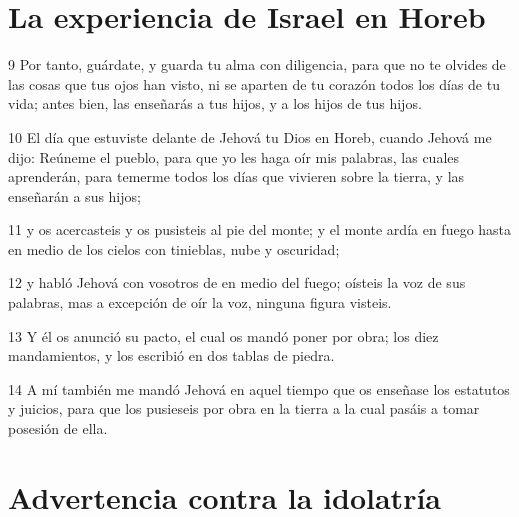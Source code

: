 \section{La experiencia de Israel en Horeb}

\par 9 Por tanto, guárdate, y guarda tu alma con diligencia, para que no te olvides de las cosas que tus ojos han visto, ni se aparten de tu corazón todos los días de tu vida; antes bien, las enseñarás a tus hijos, y a los hijos de tus hijos.
\par 10 El día que estuviste delante de Jehová tu Dios en Horeb, cuando Jehová me dijo: Reúneme el pueblo, para que yo les haga oír mis palabras, las cuales aprenderán, para temerme todos los días que vivieren sobre la tierra, y las enseñarán a sus hijos;
\par 11 y os acercasteis y os pusisteis al pie del monte; y el monte ardía en fuego hasta en medio de los cielos con tinieblas, nube y oscuridad;
\par 12 y habló Jehová con vosotros de en medio del fuego; oísteis la voz de sus palabras, mas a excepción de oír la voz, ninguna figura visteis.
\par 13 Y él os anunció su pacto, el cual os mandó poner por obra; los diez mandamientos, y los escribió en dos tablas de piedra. 
\par 14 A mí también me mandó Jehová en aquel tiempo que os enseñase los estatutos y juicios, para que los pusieseis por obra en la tierra a la cual pasáis a tomar posesión de ella.

\section{Advertencia contra la idolatría}

